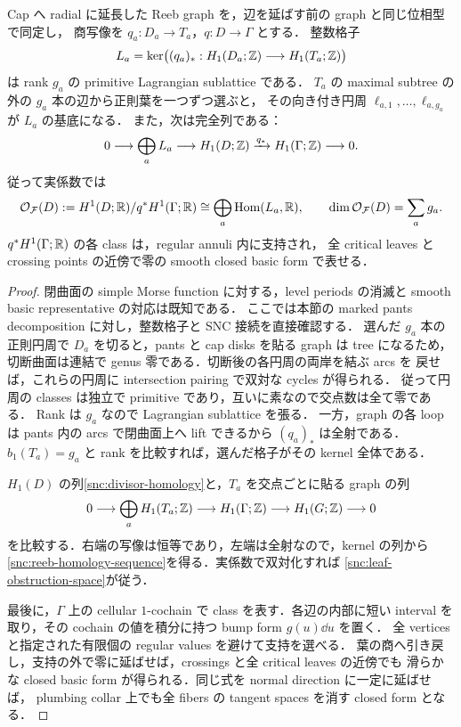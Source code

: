 \begin{lemma}
\label{snc:reeb-leaf-kernel}
Cap へ radial に延長した Reeb graph を，辺を延ばす前の graph と同じ位相型で同定し，
商写像を $q_a:D_a\to T_a$，$q:D\to\Gamma$ とする．
整数格子
\[
 L_a=\ker\bigl((q_a)_*:H_1(D_a;\mathbb Z)\longrightarrow H_1(T_a;\mathbb Z)\bigr)
\]
は rank $g_a$ の primitive Lagrangian sublattice である．
$T_a$ の maximal subtree の外の $g_a$ 本の辺から正則葉を一つずつ選ぶと，
その向き付き円周 $\ell_{a,1},\ldots,\ell_{a,g_a}$ が $L_a$ の基底になる．
また，次は完全列である：
\begin{equation}\label{snc:reeb-homology-sequence}
 0\longrightarrow\bigoplus_aL_a\longrightarrow H_1(D;\mathbb Z)
 \xrightarrow{q_*}H_1(\Gamma;\mathbb Z)\longrightarrow0.
\end{equation}
従って実係数では
\begin{equation}\label{snc:leaf-obstruction-space}
 \mathcal O_{\mathcal F}(D):=
 H^1(D;\mathbb R)/q^*H^1(\Gamma;\mathbb R)
 \cong\bigoplus_a\operatorname{Hom}(L_a,\mathbb R),
 \qquad \dim\mathcal O_{\mathcal F}(D)=\sum_a g_a.
\end{equation}
$q^*H^1(\Gamma;\mathbb R)$ の各 class は，regular annuli 内に支持され，
全 critical leaves と crossing points の近傍で零の smooth closed basic form で表せる．
\end{lemma}

\begin{proof}
閉曲面の simple Morse function に対する，level periods の消滅と smooth basic
representative の対応は既知である\cite[Lemma~4.8, p.~2421; \S5, pp.~2424--2425]{IKM}．
ここでは本節の marked pants decomposition に対し，整数格子と SNC 接続を直接確認する．
選んだ $g_a$ 本の正則円周で $D_a$ を切ると，pants と cap disks を貼る graph は tree
になるため，切断曲面は連結で genus 零である．切断後の各円周の両岸を結ぶ arcs を
戻せば，これらの円周に intersection pairing で双対な cycles が得られる．
従って円周の classes は独立で primitive であり，互いに素なので交点数は全て零である．
Rank は $g_a$ なので Lagrangian sublattice を張る．
一方，graph の各 loop は pants 内の arcs で閉曲面上へ lift できるから $(q_a)_*$ は全射である．
$b_1(T_a)=g_a$ と rank を比較すれば，選んだ格子がその kernel 全体である．

$H_1(D)$ の列\eqref{snc:divisor-homology}と，$T_a$ を交点ごとに貼る graph の列
\[
 0\longrightarrow\bigoplus_aH_1(T_a;\mathbb Z)
 \longrightarrow H_1(\Gamma;\mathbb Z)\longrightarrow H_1(G;\mathbb Z)\longrightarrow0
\]
を比較する．右端の写像は恒等であり，左端は全射なので，kernel の列から
\eqref{snc:reeb-homology-sequence}を得る．実係数で双対化すれば
\eqref{snc:leaf-obstruction-space}が従う．

最後に，$\Gamma$ 上の cellular $1$-cochain で class を表す．各辺の内部に短い interval
を取り，その cochain の値を積分に持つ bump form $g(u)\dd u$ を置く．
全 vertices と指定された有限個の regular values を避けて支持を選べる．
葉の商へ引き戻し，支持の外で零に延ばせば，crossings と全 critical leaves の近傍でも
滑らかな closed basic form が得られる．同じ式を normal direction に一定に延ばせば，
plumbing collar 上でも全 fibers の tangent spaces を消す closed form となる．
\end{proof}

